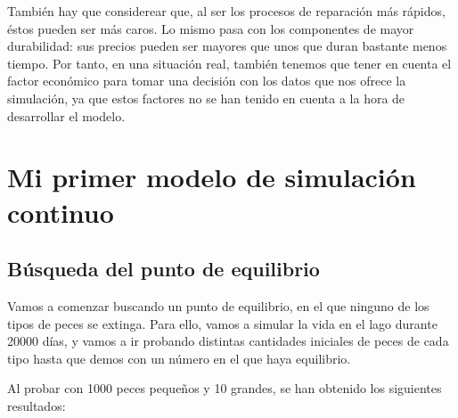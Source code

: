 \documentclass[11pt,a4paper]{report}
\begin{document}
También hay que considerear que, al ser los procesos de reparación más rápidos, éstos pueden ser más caros. Lo mismo pasa
con los componentes de mayor durabilidad: sus precios pueden ser mayores que unos que duran bastante menos tiempo. Por tanto,
en una situación real, también tenemos que tener en cuenta el factor económico para tomar una decisión con los datos que
nos ofrece la simulación, ya que estos factores no se han tenido en cuenta a la hora de desarrollar el modelo.

\newpage

\chapter{Mi primer modelo de simulación continuo}

\section{Búsqueda del punto de equilibrio}

Vamos a comenzar buscando un punto de equilibrio, en el que ninguno de los tipos de peces se extinga. Para ello, vamos a
simular la vida en el lago durante 20000 días, y vamos a ir probando distintas cantidades iniciales de peces de cada tipo
hasta que demos con un número en el que haya equilibrio.

Al probar con 1000 peces pequeños y 10 grandes, se han obtenido los siguientes resultados:
\end{document}
